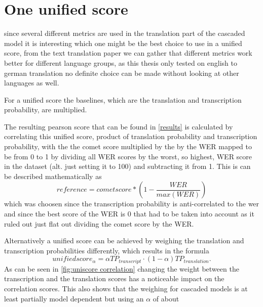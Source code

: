 \section{One unified score}
since several different metrics are used in the translation part of the cascaded model it is interesting which one might be the best choice to use in a unified score, from the text translation paper \cite{fomicheva2020unsupervised} we can gather that different metrics work better for different language groups, as this thesis only tested on english to german translation no definite choice can be made without looking at other languages as well.

For a unified score the baselines, which are the translation and transcription probability, are multiplied. 

The resulting pearson score that can be found in \autoref{results} is calculated by correlating this unified score, product of translation probability and transcription probability, with the the comet score multiplied by the by the WER mapped to be from 0 to 1 by dividing all WER scores by the worst, so highest, WER score in the dataset (alt. just setting it to 100) and subtracting it from 1. 
This is can be described mathematically as 
$$reference = cometscore*(1-\frac{WER}{max(WER)})$$
which was choosen since the transcription probability is anti-correlated to the wer and since the best score of the WER is 0 that had to be taken into account as it ruled out just flat out dividing the comet score by the WER.

Alternatively a unified score can be achieved by weighing the translation and transcription probabilities differently, which results in the formula $$unifiedscore_\alpha= \alpha TP_{transcript} \cdot (1-\alpha)TP_{translation}.$$ 
As can be seen in \autoref{fig:uniscore correlation} changing the weight between the transcription and the translation scores has a noticeable impact on the correlation scores. 
This also shows that the weighing for cascaded models is at least partially model dependent but using an $\alpha$ of about 


